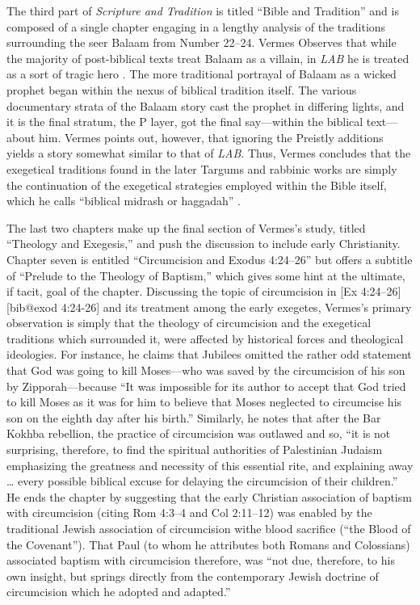 The third part of \emph{Scripture and Tradition} is titled ``Bible and
Tradition'' and is composed of a single chapter engaging in a lengthy
analysis of the traditions surrounding the seer Balaam from Number
22--24. Vermes Observes that while the majority of post-biblical texts
treat Balaam as a villain, in \emph{LAB} he is treated as a sort of
tragic hero \autocite[173]{vermes1961}. The more traditional portrayal
of Balaam as a wicked prophet began within the nexus of biblical
tradition itself. The various documentary strata of the Balaam story
cast the prophet in differing lights, and it is the final stratum, the P
layer, got the final say---within the biblical text---about him. Vermes
points out, however, that ignoring the Preistly additions yields a story
somewhat similar to that of \emph{LAB}. Thus, Vermes concludes that the
exegetical traditions found in the later Targums and rabbinic works are
simply the continuation of the exegetical strategies employed within the
Bible itself, which he calls ``biblical midrash or haggadah''
\autocite[176]{vermes1961}.

The last two chapters make up the final section of Vermes's study,
titled ``Theology and Exegesis,'' and push the discussion to include
early Christianity. Chapter seven is entitled ``Circumcision and Exodus
4:24--26'' but offers a subtitle of ``Prelude to the Theology of
Baptism,'' which gives some hint at the ultimate, if tacit, goal of the
chapter. Discussing the topic of circumcision in {[}Ex
4:24--26{]}{[}bib@exod 4:24-26{]} and its treatment among the early
exegetes, Vermes's primary observation is simply that the theology of
circumcision and the exegetical traditions which surrounded it, were
affected by historical forces and theological ideologies. For instance,
he claims that Jubilees omitted the rather odd statement that God was
going to kill Moses---who was saved by the circumcision of his son by
Zipporah---because ``It was impossible for its author to accept that God
tried to kill Moses as it was for him to believe that Moses neglected to
circumcise his son on the eighth day after his
birth.''\autocite[185]{vermes1961} Similarly, he notes that after the
Bar Kokhba rebellion, the practice of circumcision was outlawed and so,
``it is not surprising, therefore, to find the spiritual authorities of
Palestinian Judaism emphasizing the greatness and necessity of this
essential rite, and explaining away \ldots{} every possible biblical
excuse for delaying the circumcision of their
children.''\autocite[189]{vermes1961} He ends the chapter by suggesting
that the early Christian association of baptism with circumcision
(citing Rom 4:3--4 and Col 2:11--12) was enabled by the traditional
Jewish association of circumcision withe blood sacrifice (``the Blood of
the Covenant'')\autocite[190]{vermes1961}. That Paul (to whom he
attributes both Romans and Colossians) associated baptism with
circumcision therefore, was ``not due, therefore, to his own insight,
but springs directly from the contemporary Jewish doctrine of
circumcision which he adopted and adapted.''\autocite[191]{vermes1961}

